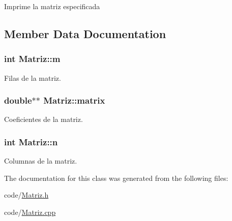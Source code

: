 Imprime la matriz especificada 

\subsection{Member Data Documentation}
\hypertarget{class_matriz_a7141f8b75ce8aa34bded24988fd30998}{
\subsubsection[{m}]{\setlength{\rightskip}{0pt plus 5cm}int Matriz\+::m}}\label{class_matriz_a7141f8b75ce8aa34bded24988fd30998}


Filas de la matriz. 

\hypertarget{class_matriz_a9a061f4b43d8ba4be7377311590450c1}{
\subsubsection[{matrix}]{\setlength{\rightskip}{0pt plus 5cm}double$\ast$$\ast$ Matriz\+::matrix}}\label{class_matriz_a9a061f4b43d8ba4be7377311590450c1}


Coeficientes de la matriz. 

\hypertarget{class_matriz_a3b5041f8eaee4aa3ef646378f0dd2d6d}{
\subsubsection[{n}]{\setlength{\rightskip}{0pt plus 5cm}int Matriz\+::n}}\label{class_matriz_a3b5041f8eaee4aa3ef646378f0dd2d6d}


Columnas de la matriz. 



The documentation for this class was generated from the following files\+:\begin{DoxyCompactItemize}
\item 
code/\hyperlink{_matriz_8h}{Matriz.\+h}\item 
code/\hyperlink{_matriz_8cpp}{Matriz.\+cpp}\end{DoxyCompactItemize}
